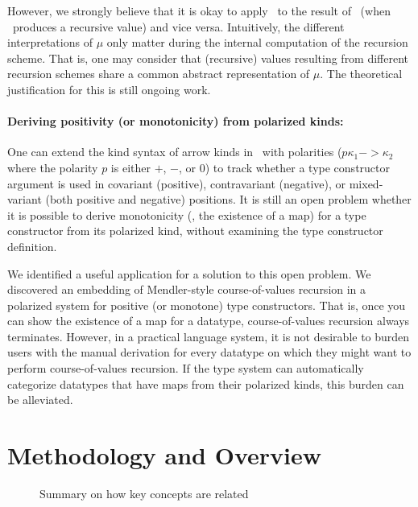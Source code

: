 However, we strongly believe that it is okay to apply \MsfIt\ to
the result of \MPr\ (when \MPr\ produces a recursive value) and vice versa.
Intuitively, the different interpretations of $\mu$ only matter during
the internal computation of the recursion scheme. That is, one may consider
that (recursive) values resulting from different recursion schemes
share a common abstract representation of $\mu$.
The theoretical justification for this is still ongoing work.

\paragraph{Deriving positivity (or monotonicity) from polarized kinds:}
One can extend the kind syntax of arrow kinds in \Fw\ with polarities
($p\kappa_1 -> \kappa_2$ where the polarity $p$ is either $+$, $-$, or $0$)
to track whether a type constructor argument is used in
covariant (positive), contravariant (negative), or
mixed-variant (both positive and negative) positions.
It is still an open problem whether it is possible to derive monotonicity
(\ie, the  existence of a map) for a type constructor from its polarized kind,
without examining the type constructor definition.

We identified a useful application for a solution to this open problem.
We discovered an embedding of Mendler-style course-of-values recursion in
a polarized system for positive (or monotone) type constructors.
That is, once you can show the existence of a map for a datatype,
course-of-values recursion always terminates.
However, in a practical language system, it is not desirable to burden users
with the manual derivation for every datatype on which they might want to
perform course-of-values recursion. If the type system can automatically
categorize datatypes that have maps from their polarized kinds,
this burden can be alleviated.

\section{Methodology and Overview}\label{sec:intro:overview}
\begin{figure}

\caption{Summary on how key concepts are related}
\label{fig:overview}
\end{figure}

